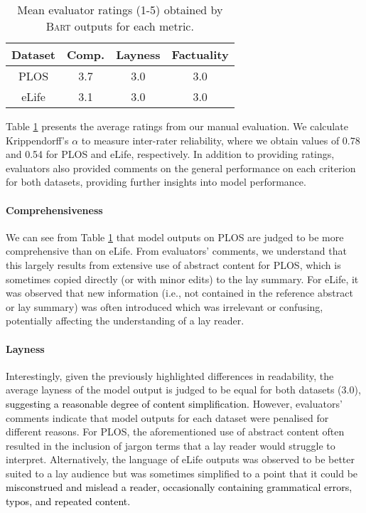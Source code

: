 \documentclass[11pt]{article}
\begin{document}
\begin{table}[]
    \centering
    \begin{tabular}{cccc}
         \hline
         \textbf{Dataset} & \textbf{Comp.} & \textbf{Layness} &\textbf{Factuality} \\ \hline
         PLOS & 3.7 & 3.0 & 3.0 \\
         eLife & 3.1 & 3.0 & 3.0 \\ \hline 
    \end{tabular}
    \caption{Mean evaluator ratings (1-5) obtained by \textsc{Bart} outputs for each metric.}
    \label{tab:human_eval}
\end{table}

Table \ref{tab:human_eval} presents the average ratings from our manual evaluation. We calculate Krippendorff's $\alpha$ to measure inter-rater reliability, where we obtain values of 0.78 and 0.54 for PLOS and eLife, respectively. In addition to providing ratings, evaluators also provided comments on the general performance on each criterion for both datasets, providing further insights into model performance.


\paragraph{Comprehensiveness}


We can see from Table \ref{tab:human_eval} that model outputs on PLOS are judged to be more comprehensive than on eLife. From evaluators' comments, we understand that this largely results from extensive use of abstract content for PLOS, which is sometimes copied directly (or with minor edits) to the lay summary.  
For eLife, it was observed that new information (i.e., not contained in the reference abstract or lay summary) was often introduced which was irrelevant or confusing, potentially affecting the understanding of a lay reader.


\paragraph{Layness}
Interestingly, given the previously highlighted differences in readability, the average layness of the model output is judged to be equal for both datasets (3.0), \textcolor{black}{suggesting a reasonable degree of content simplification.}  
However, evaluators' comments indicate that model outputs for each dataset were penalised for different reasons. For PLOS, the aforementioned use of abstract content often resulted in the inclusion of jargon terms that a lay reader would struggle to interpret. Alternatively, the language of eLife outputs was observed to be better suited to a lay audience but was sometimes simplified to a point that it could be \textcolor{black}{misconstrued and mislead a reader, occasionally containing grammatical errors, typos, and repeated content.} 
\end{document}
